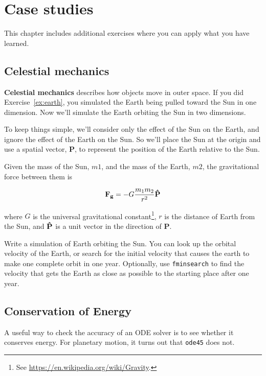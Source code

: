 \documentclass[
]{book}
\numberwithin{Answer}{chapter}
\numberwithin{Exercise}{chapter}
\renewcommand{\vec}[1]{\bm{\mathbf{#1}}}
\newcommand{\uveci}{{\bm{\hat{\textnormal{\bfseries\i}}}}}
\newcommand{\uvecj}{{\bm{\hat{\textnormal{\bfseries\j}}}}}
\newcommand{\uvec}[1]{%
    \ifthenelse{\equal{#1}{i}}%
        {\uveci}{%
    \ifthenelse{\equal{#1}{j}}%
        {\uvecj}{%
    {\bm{\hat{\mathbf{#1}}}}%
}}}
\begin{document}
\chapter{Case studies}

This chapter includes additional exercises where you can apply what you have learned.

\section{Celestial mechanics}

{\bf Celestial mechanics} describes how objects move in outer space.
If you did Exercise~\ref{ex:earth}, you simulated the Earth being pulled toward the Sun in one dimension.  Now we'll simulate the Earth orbiting the Sun in two dimensions.

To keep things simple, we'll consider only the effect of the Sun on the Earth, and ignore the effect of the Earth on the Sun.  So we'll place the Sun at the origin and use a spatial vector, $\vec{P}$, to represent the position of the Earth relative to the Sun.

Given the mass of the Sun, $m1$, and the mass of the Earth, $m2$, the gravitational force between them is

\begin{equation*}
\vec{F_g} = -G \frac{m_1 m_2}{r^2} \uvec{P}
\end{equation*}

where $G$ is the universal gravitational constant\footnote{See \url{https://en.wikipedia.org/wiki/Gravity}.},
$r$ is the distance of Earth from the Sun, and
$\uvec{P}$ is a unit vector in the direction of $\vec{P}$.

Write a simulation of Earth orbiting the Sun.  You can look up the orbital velocity of the Earth, or search for the initial velocity that causes the earth to make one complete orbit in one year.  Optionally, use {\tt fminsearch} to find the velocity that gets the Earth as close as possible to the starting place after one year.



\section{Conservation of Energy}

A useful way to check the accuracy of an ODE solver is to see whether it conserves energy.  For planetary motion, it turns out that {\tt ode45} does not.
\end{document}
